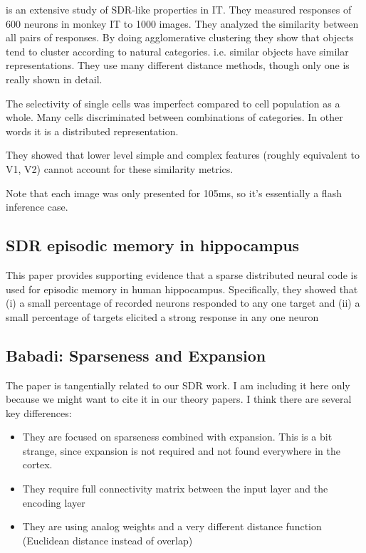 \documentclass{article} %
\begin{document}
\cite{Kiani2007} is an extensive study of SDR-like properties in IT. They
measured responses of 600 neurons in monkey IT to 1000 images. They analyzed the
similarity between all pairs of responses. By doing agglomerative clustering
they show that objects tend to cluster according to natural categories. i.e.
similar objects have similar representations. They use many different distance
methods, though only one is really shown in detail.

The selectivity of single cells was imperfect compared to cell population as a
whole. Many cells discriminated between combinations of categories. In other
words it is a distributed representation.

They showed that lower level simple and complex features (roughly equivalent to
V1, V2) cannot account for these similarity metrics.

Note that each image was only presented for 105ms, so it's essentially a flash
inference case.

\subsection{SDR episodic memory in hippocampus} This paper \cite{Wixted2014}
provides supporting evidence that a sparse distributed neural code  is used for
episodic memory in human hippocampus. Specifically, they showed that  (i) a
small  percentage of recorded neurons responded to any one target and (ii) a
small percentage of targets  elicited a strong response in any one neuron

\subsection{Babadi: Sparseness and Expansion}


The paper \cite{Babadi2014} is tangentially related to our SDR work. I am
including it here only because we might want to cite it in our
theory papers. I think there are several key differences:

\begin{itemize}
\item They are focused on sparseness combined with expansion. This is a bit
strange, since expansion is not required and not found everywhere in the cortex.

\item They require full connectivity matrix between the input layer and the
encoding layer

\item They are using analog weights and a very different distance function
(Euclidean distance instead of overlap)

\end{itemize}
\end{document}
